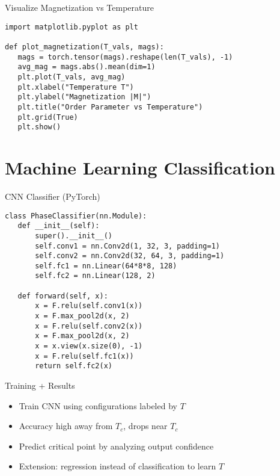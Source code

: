 \documentclass{beamer}
\begin{document}
\begin{frame}[fragile]{Visualize Magnetization vs Temperature}
\begin{lstlisting}
import matplotlib.pyplot as plt

def plot_magnetization(T_vals, mags):
   mags = torch.tensor(mags).reshape(len(T_vals), -1)
   avg_mag = mags.abs().mean(dim=1)
   plt.plot(T_vals, avg_mag)
   plt.xlabel("Temperature T")
   plt.ylabel("Magnetization |M|")
   plt.title("Order Parameter vs Temperature")
   plt.grid(True)
   plt.show()
\end{lstlisting}
\end{frame}


\section{Machine Learning Classification}

\begin{frame}[fragile]{CNN Classifier (PyTorch)}
\begin{lstlisting}
class PhaseClassifier(nn.Module):
   def __init__(self):
       super().__init__()
       self.conv1 = nn.Conv2d(1, 32, 3, padding=1)
       self.conv2 = nn.Conv2d(32, 64, 3, padding=1)
       self.fc1 = nn.Linear(64*8*8, 128)
       self.fc2 = nn.Linear(128, 2)

   def forward(self, x):
       x = F.relu(self.conv1(x))
       x = F.max_pool2d(x, 2)
       x = F.relu(self.conv2(x))
       x = F.max_pool2d(x, 2)
       x = x.view(x.size(0), -1)
       x = F.relu(self.fc1(x))
       return self.fc2(x)
\end{lstlisting}
\end{frame}

\begin{frame}{Training + Results}
 \begin{itemize}
   \item Train CNN using configurations labeled by $T$
   \item Accuracy high away from $T_c$, drops near $T_c$
   \item Predict critical point by analyzing output confidence
   \item Extension: regression instead of classification to learn $T$
 \end{itemize}
\end{frame}

\end{document}
